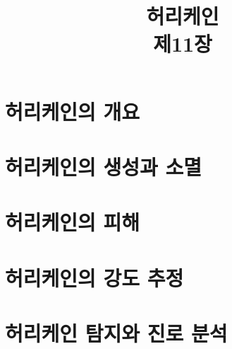 \title[]{허리케인\\\small{제11장}}

\begin{frame}[plain] %
	\titlepage
\end{frame}


\section{허리케인의 개요}


\section{허리케인의 생성과 소멸}

\section{허리케인의 피해}

\section{허리케인의 강도 추정}

\section{허리케인 탐지와 진로 분석}

